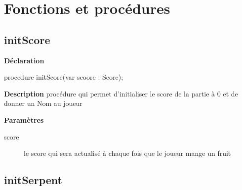 \documentclass{report}
\newif\ifpdf
\begin{document}
\section{Fonctions et procédures}
\ifpdf
\subsection*{\large{\textbf{initScore}}\normalsize\hspace{1ex}\hrulefill}
\else
\subsection*{initScore}
\fi
\label{Initialisation-initScore}
\begin{list}{}{
\setlength{\itemindent}{0cm}
\setlength{\listparindent}{0cm}
\setlength{\leftmargin}{\evensidemargin}
\addtolength{\leftmargin}{\tmplength}
\settowidth{\labelsep}{X}
\addtolength{\leftmargin}{\labelsep}
\setlength{\labelwidth}{\tmplength}
}
\item[\textbf{Déclaration}\hfill]
\ifpdf
\begin{flushleft}
\fi
\begin{ttfamily}
procedure initScore(var scoore : Score);\end{ttfamily}

\ifpdf
\end{flushleft}
\fi

\par
\item[\textbf{Description}]
procédure qui permet d'initialiser le score de la partie à 0 et de donner un Nom au joueur \par
\item[\textbf{Paramètres}]
\begin{description}
\item[score] le score qui sera actualisé à chaque fois que le joueur mange un fruit
\end{description}


\end{list}
\ifpdf
\subsection*{\large{\textbf{initSerpent}}\normalsize\hspace{1ex}\hrulefill}
\else
\end{document}
